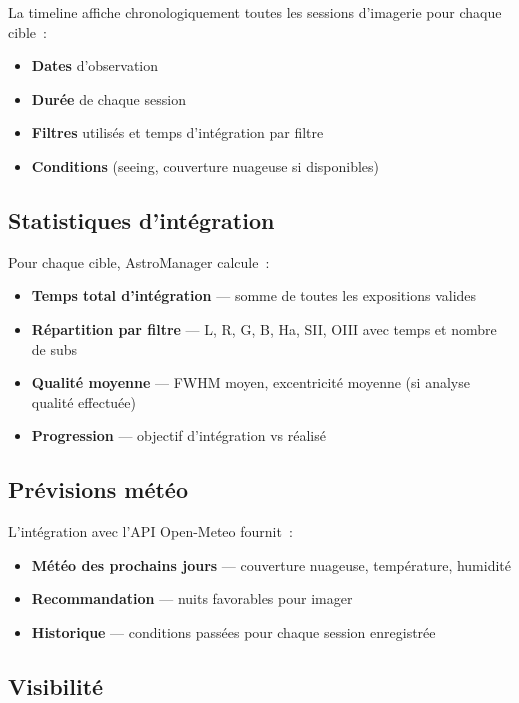 \documentclass[a4paper,11pt]{article}
\begin{document}
La timeline affiche chronologiquement toutes les sessions d'imagerie pour chaque cible~:

\begin{itemize}
    \item \textbf{Dates} d'observation
    \item \textbf{Dur\'{e}e} de chaque session
    \item \textbf{Filtres} utilis\'{e}s et temps d'int\'{e}gration par filtre
    \item \textbf{Conditions} (seeing, couverture nuageuse si disponibles)
\end{itemize}

\subsection{Statistiques d'int\'{e}gration}

Pour chaque cible, AstroManager calcule~:

\begin{itemize}
    \item \textbf{Temps total d'int\'{e}gration} --- somme de toutes les expositions valides
    \item \textbf{R\'{e}partition par filtre} --- L, R, G, B, Ha, SII, OIII avec temps et nombre de subs
    \item \textbf{Qualit\'{e} moyenne} --- FWHM moyen, excentricit\'{e} moyenne (si analyse qualit\'{e} effectu\'{e}e)
    \item \textbf{Progression} --- objectif d'int\'{e}gration vs r\'{e}alis\'{e}
\end{itemize}

\subsection{Pr\'{e}visions m\'{e}t\'{e}o}

L'int\'{e}gration avec l'API Open-Meteo fournit~:

\begin{itemize}
    \item \textbf{M\'{e}t\'{e}o des prochains jours} --- couverture nuageuse, temp\'{e}rature, humidit\'{e}
    \item \textbf{Recommandation} --- nuits favorables pour imager
    \item \textbf{Historique} --- conditions pass\'{e}es pour chaque session enregistr\'{e}e
\end{itemize}

\subsection{Visibilit\'{e}}
\end{document}

